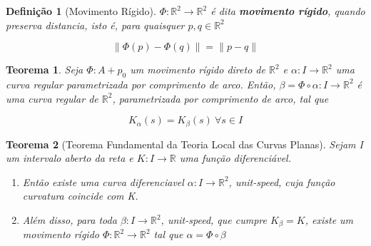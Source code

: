 \documentclass[12pt]{article}
\newtheorem{theorem}{Teorema}
\newtheorem{definition}{Definição}
\begin{document}
\begin{definition}[Movimento Rígido]
$\Phi: \mathbb{R}^2 \rightarrow \mathbb{R}^2$ é dita \textbf{movimento rígido}, quando preserva distancia, isto é, para quaisquer $p, q \in \mathbb{R}^2$

$$\| \Phi(p) - \Phi(q) \| = \| p - q \|$$
\end{definition}

\begin{theorem}
Seja $\Phi: A + p_0$ um movimento rígido direto de $\mathbb{R}^2$ e $\alpha: I \rightarrow \mathbb{R}^2$ uma curva regular parametrizada por comprimento de arco. Então, $\beta = \Phi \circ \alpha: I \rightarrow \mathbb{R}^2$ é uma curva regular de $\mathbb{R}^2$, parametrizada por comprimento de arco, tal que

$$K_\alpha(s) = K_\beta(s) \ \forall s \in I$$
\end{theorem}

\begin{theorem}[Teorema Fundamental da Teoria Local das Curvas Planas]
Sejam I um intervalo aberto da reta e $K: I \rightarrow \mathbb{R}$ uma função diferenciável.

\begin{enumerate}
    \item Então existe uma curva diferenciavel $\alpha: I \rightarrow \mathbb{R}^2$, unit-speed, cuja função curvatura coincide com K.
    
    \item Além disso, para toda $\beta: I \rightarrow \mathbb{R}^2$, unit-speed, que cumpre $K_\beta = K$, existe um movimento rígido $\Phi: \mathbb{R}^2 \rightarrow \mathbb{R}^2$ tal que $\alpha = \Phi \circ \beta$
\end{enumerate}
\end{theorem}
\end{document}
